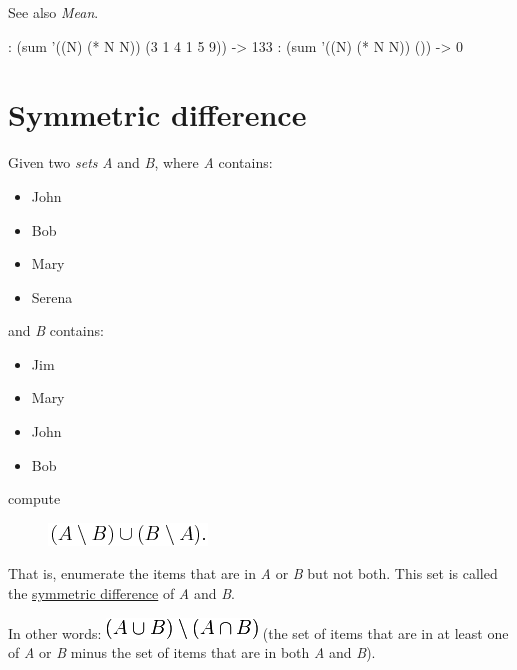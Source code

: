 See also \emph{Mean}.


\begin{wideverbatim}

: (sum '((N) (* N N)) (3 1 4 1 5 9))
-> 133
: (sum '((N) (* N N)) ())
-> 0

\end{wideverbatim}

\pagebreak{}
\section*{Symmetric difference}


Given two \emph{sets} \emph{A} and \emph{B}, where \emph{A}
contains:

\begin{itemize}
\item
  John
\item
  Bob
\item
  Mary
\item
  Serena
\end{itemize}

and \emph{B} contains:

\begin{itemize}
\item
  Jim
\item
  Mary
\item
  John
\item
  Bob
\end{itemize}

compute

\begin{figure}[H]
\centering
\includegraphics[scale=.6]{graphics/cd81bcd600dda401fc4cfbc6646bbbc9.png}
\end{figure}

That is, enumerate the items that are in \emph{A} or \emph{B} but not
both. This set is called the
\href{http://en.wikipedia.org/wiki/Symmetric\_difference}{symmetric
difference} of \emph{A} and \emph{B}.

In other words:
\includegraphics[scale=.6]{graphics/3fdf48da32bf746ea787b61406ca05e7.png}
(the set of items that are in at least one of \emph{A} or \emph{B} minus
the set of items that are in both \emph{A} and \emph{B}).

